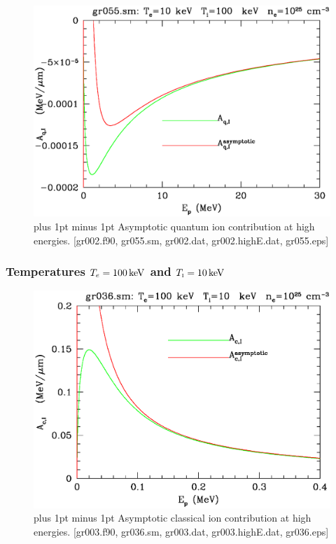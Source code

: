 \documentclass[preprint,12pt,eqsecnum,nofootinbib,amsmath,amssymb]{revtex4}
\newcommand{\smI}{{\rm\scriptscriptstyle I}}
\newcommand{\footnoteskip}{\baselineskip 12pt plus 1pt minus 1pt}
\begin{document}
\vskip-2cm 
\begin{figure}[h!]
\includegraphics[scale=0.45]{gr055.eps} 
\vskip-0.8cm 
\caption{\footnoteskip  
  Asymptotic quantum ion contribution at high energies. [gr002.f90,
  gr055.sm, gr002.dat, gr002.highE.dat, gr055.eps]
}
\label{fig:gr055}
\end{figure}

\pagebreak
\subsubsection{Temperatures $T_e=100\,{\rm keV}$ and $T_\smI=10\,{\rm keV}$}

\vskip-2cm 
\begin{figure}[h!]
\includegraphics[scale=0.45]{gr036.eps} 
\vskip-0.8cm 
\caption{\footnoteskip  
  Asymptotic classical ion contribution at high energies. [gr003.f90,
  gr036.sm, gr003.dat, gr003.highE.dat, gr036.eps]
}
\label{fig:gr036}
\end{figure}
\end{document}
